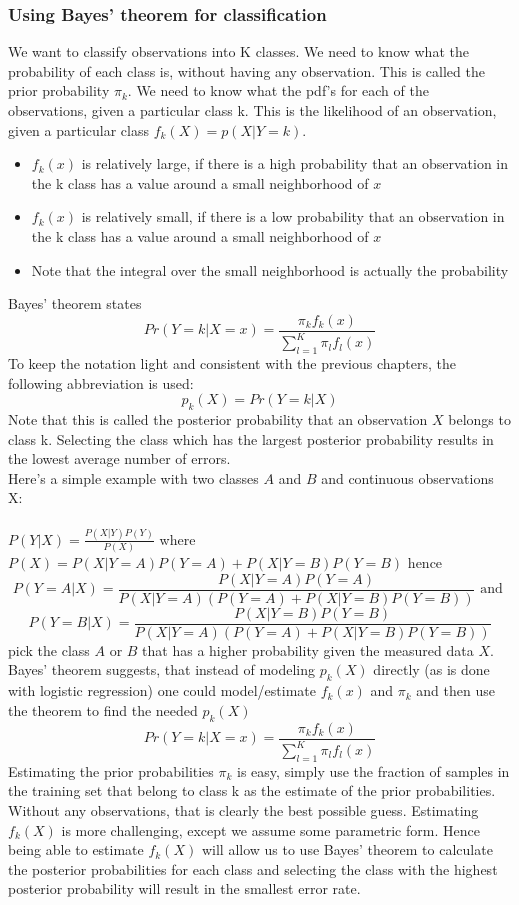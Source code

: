 {\renewcommand{\arraystretch}{1.5}
	\subsubsection{Using Bayes' theorem for classification}
	We want to classify observations into K classes. We need to know what the probability of each class is, without having any observation.
	This is called the prior probability $\pi_k$. We need to know what the pdf's for each of the observations, given a particular class k.
	This is the likelihood of an observation, given a particular class $f_k(X)=p(X|Y=k)$.
	\begin{itemize}
		\item $f_k(x)$ is relatively large, if there is a high probability that an observation in the k class has a value around a small neighborhood of $x$
		\item $f_k(x)$ is relatively small, if there is a low probability that an observation in the k class has a value around a small neighborhood of $x$
		\item Note that the integral over the small neighborhood is actually the probability
	\end{itemize}
	Bayes' theorem states \[ Pr(Y=k|X=x)=\frac{\pi_kf_k(x)}{\sum_{l=1}^{K}\pi_lf_l(x)}\]
	To keep the notation light and consistent with the previous chapters, the following abbreviation is used:
	\[ p_k(X)=Pr(Y=k|X)\]
	Note that this is called the posterior probability that an observation $X$ belongs to class k.
	Selecting the class which has the largest posterior probability results in the lowest average number of errors. \\
	Here's a simple example with two classes $A$ and $B$ and continuous observations X: \\
	\\
	$P(Y|X)=\frac{P(X|Y)P(Y)}{P(X)}$ where $P(X)=P(X|Y=A)P(Y=A)+P(X|Y=B)P(Y=B)$ hence
	\[ P(Y=A|X)=\frac{P(X|Y=A)P(Y=A)}{P(X|Y=A)(P(Y=A)+P(X|Y=B)P(Y=B))} \text{ and } \]
	\[ P(Y=B|X)=\frac{P(X|Y=B)P(Y=B)}{P(X|Y=A)(P(Y=A)+P(X|Y=B)P(Y=B))} \]
	pick the class $A$ or $B$ that has a higher probability given the measured data $X$. \\
	Bayes' theorem suggests, that instead of modeling $p_k(X)$ directly (as is done with logistic regression) one could model/estimate $f_k(x)$ and $\pi_k$ and then use the theorem to find the needed $p_k(X)$
	\[ Pr(Y=k|X=x)=\frac{\pi_kf_k(x)}{\sum_{l=1}^{K}\pi_lf_l(x)} \]
	Estimating the prior probabilities $\pi_k$ is easy, simply use the fraction of samples in the training set that belong to class k as the estimate of the prior probabilities.
	Without any observations, that is clearly the best possible guess.
	Estimating $f_k(X)$ is more challenging, except we assume some parametric form.
	Hence being able to estimate $f_k(X)$ will allow us to use Bayes' theorem to calculate the posterior probabilities
	for each class and selecting the class with the highest posterior probability will result in the smallest error rate.


}
